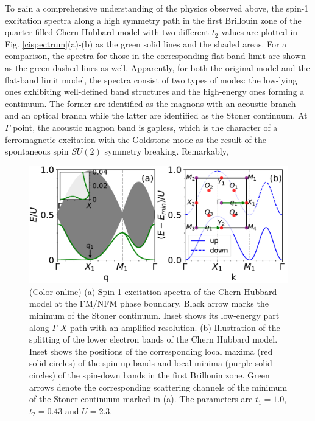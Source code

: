 \documentclass[amsmath,superscriptaddress,showpacs,aps,prb,twocolumn]{revtex4-1}
\begin{document}
\par To gain a comprehensive understanding of the physics observed above, the spin-1 excitation spectra along a high symmetry path in the first Brillouin zone of the quarter-filled Chern Hubbard model with two different $t_2$ values are plotted in Fig. \ref{cispectrum}(a)-(b) as the green solid lines and the shaded areas. For a comparison, the spectra for those in the corresponding flat-band limit are shown as the green dashed lines as well. Apparently, for both the original model and the flat-band limit model, the spectra consist of two types of modes: the low-lying ones exhibiting well-defined band structures and the high-energy ones forming a continuum. The former are identified as the magnons with an acoustic branch and an optical branch while the latter are identified as the Stoner continuum. At $\Gamma$ point, the acoustic magnon band is gapless, which is the character of a ferromagnetic excitation with the Goldstone mode as the result of the spontaneous spin $SU(2)$ symmetry breaking. Remarkably,

\begin{figure}
\includegraphics[width=\columnwidth]{pbcispectrum}
\caption{(Color online) (a) Spin-1 excitation spectra of the Chern Hubbard model at the FM/NFM phase boundary. Black arrow marks the minimum of the Stoner continuum. Inset shows its low-energy part along $\Gamma$-$X$ path with an amplified resolution. (b) Illustration of the splitting of the lower electron bands of the Chern Hubbard model. Inset shows the positions of the corresponding local maxima (red solid circles) of the spin-up bands and local minima (purple solid circles) of the spin-down bands in the first Brillouin zone. Green arrows denote the corresponding scattering channels of the minimum of the Stoner continuum marked in (a). The parameters are $t_1=1.0$, $t_2=0.43$ and $U=2.3$.}
\label{pbcispectrum}
\end{figure}
\end{document}
